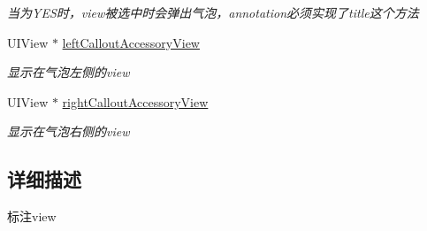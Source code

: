 \begin{DoxyCompactItemize}
\begin{DoxyCompactList}\small\item\em 当为\+Y\+E\+S时，view被选中时会弹出气泡，annotation必须实现了title这个方法 \end{DoxyCompactList}\item 
\hypertarget{interface_b_m_k_annotation_view_ae182c0fb7dc1898c4941a123def7f926}{U\+I\+View $\ast$ \hyperlink{interface_b_m_k_annotation_view_ae182c0fb7dc1898c4941a123def7f926}{left\+Callout\+Accessory\+View}}\label{interface_b_m_k_annotation_view_ae182c0fb7dc1898c4941a123def7f926}

\begin{DoxyCompactList}\small\item\em 显示在气泡左侧的view \end{DoxyCompactList}\item 
\hypertarget{interface_b_m_k_annotation_view_a65793288845c27e23233373b3e6b6216}{U\+I\+View $\ast$ \hyperlink{interface_b_m_k_annotation_view_a65793288845c27e23233373b3e6b6216}{right\+Callout\+Accessory\+View}}\label{interface_b_m_k_annotation_view_a65793288845c27e23233373b3e6b6216}

\begin{DoxyCompactList}\small\item\em 显示在气泡右侧的view \end{DoxyCompactList}\end{DoxyCompactItemize}


\subsection{详细描述}
标注view 

